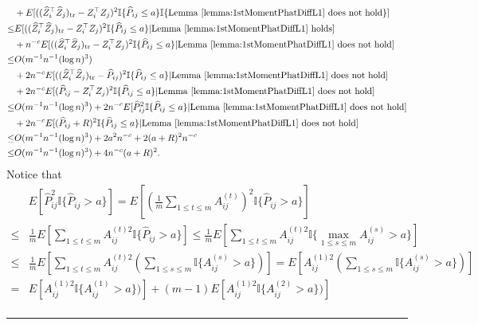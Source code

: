 \documentclass[a4paper]{article}
\newenvironment{proof}{{\bf Proof:  }}{\hfill\rule{2mm}{2mm}}
\renewcommand{\hat}{\widehat}
\begin{document}
\begin{proof}
\begin{align*}
	& + E[((\hat{Z}_i^{\top} \hat{Z}_j)_{\mathrm{tr}} - Z_i^{\top} Z_j)^2 \mathbb{I}\{\hat{P}_{ij} \le a\} \mathbb{I}\{\mathrm{Lemma\ } \ref{lemma:1stMomentPhatDiffL1} \mathrm{\ does\ not\ hold}\}] \\
	\le & E[((\hat{Z}_i^{\top} \hat{Z}_j)_{\mathrm{tr}} - Z_i^{\top} Z_j)^2 \mathbb{I}\{\hat{P}_{ij} \le a\} | \mathrm{Lemma\ } \ref{lemma:1stMomentPhatDiffL1} \mathrm{\ holds}] \\
	& + n^{-c} E[((\hat{Z}_i^{\top} \hat{Z}_j)_{\mathrm{tr}} - Z_i^{\top} Z_j)^2 \mathbb{I}\{\hat{P}_{ij} \le a\} | \mathrm{Lemma\ } \ref{lemma:1stMomentPhatDiffL1} \mathrm{\ does\ not\ hold}] \\
	\le & O(m^{-1} n^{-1} (\log n)^3) \\
	& + 2 n^{-c} E[((\hat{Z}_i^{\top} \hat{Z}_j)_{\mathrm{tr}} - \hat{P}_{ij})^2 \mathbb{I}\{\hat{P}_{ij} \le a\}| \mathrm{Lemma\ } \ref{lemma:1stMomentPhatDiffL1} \mathrm{\ does\ not\ hold}] \\
	& + 2 n^{-c} E[(\hat{P}_{ij} - Z_i^{\top} Z_j)^2 \mathbb{I}\{\hat{P}_{ij} \le a\}| \mathrm{Lemma\ } \ref{lemma:1stMomentPhatDiffL1} \mathrm{\ does\ not\ hold}] \\
	\le & O(m^{-1} n^{-1} (\log n)^3) + 2 n^{-c} E[\hat{P}_{ij}^2 \mathbb{I}\{\hat{P}_{ij} \le a\}| \mathrm{Lemma\ } \ref{lemma:1stMomentPhatDiffL1} \mathrm{\ does\ not\ hold}] \\
	& + 2 n^{-c} E[(\hat{P}_{ij} + R)^2 \mathbb{I}\{\hat{P}_{ij} \le a\}| \mathrm{Lemma\ } \ref{lemma:1stMomentPhatDiffL1} \mathrm{\ does\ not\ hold}] \\
	\le & O(m^{-1} n^{-1} (\log n)^3) + 2 a^2 n^{-c} + 2 (a+R)^2 n^{-c} \\
	\le & O(m^{-1} n^{-1} (\log n)^3) + 4 n^{-c} (a + R)^2.
\end{align*}
Notice that
\begin{align*}
	& E[\hat{P}_{ij}^2 \mathbb{I} \{ \hat{P}_{ij} > a \}]
	= E[(\frac{1}{m} \sum_{1 \le t \le m} A_{ij}^{(t)})^2 \mathbb{I} \{ \hat{P}_{ij} > a \}] \\
	\le & \frac{1}{m} E[\sum_{1 \le t \le m} A_{ij}^{(t)2} \mathbb{I} \{ \hat{P}_{ij} > a \}]
	\le \frac{1}{m} E[\sum_{1 \le t \le m} A_{ij}^{(t)2} \mathbb{I} \{ \max_{1 \le s \le m} A_{ij}^{(s)} > a \}] \\
	\le & \frac{1}{m} E[\sum_{1 \le t \le m} A_{ij}^{(t)2} (\sum_{1 \le s \le m}\mathbb{I} \{ A_{ij}^{(s)} > a \})]
	= E[A_{ij}^{(1)2} (\sum_{1 \le s \le m}\mathbb{I} \{ A_{ij}^{(s)} > a \})] \\
	= & E[A_{ij}^{(1)2} \mathbb{I} \{ A_{ij}^{(1)} > a \})] + (m-1) E[A_{ij}^{(1)2} \mathbb{I} \{ A_{ij}^{(2)} > a \})] \\

\end{align*}
\end{proof}
\end{document}
